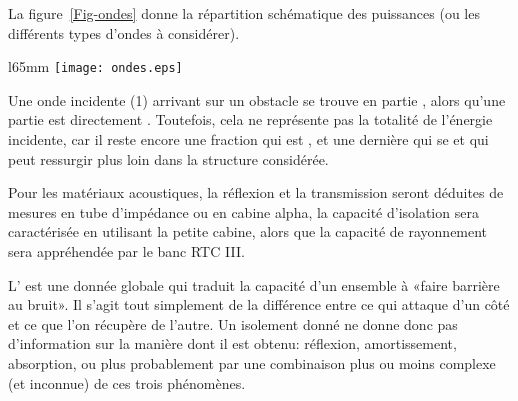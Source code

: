 La figure~\ref{Fig-ondes} donne la répartition schématique des puissances (ou les différents types d'ondes à considérer).
\begin{wrapfigure}{l}{65mm}
\centering
\texttt{[image: ondes.eps]}\hspace{1cm}
\caption{Répartition schématique des puissances}\label{Fig-ondes}%
\end{wrapfigure}
Une onde incidente (1) arrivant sur un obstacle se trouve en partie , alors qu'une partie est directement . Toutefois, cela ne représente pas la totalité de l'énergie incidente, car il reste encore une fraction qui est , et une dernière qui se  et qui peut ressurgir plus loin dans la structure considérée.

\medskip
Pour les matériaux acoustiques, la réflexion et la transmission seront déduites de mesures en tube d'impédance ou en cabine alpha, la capacité d'isolation sera caractérisée en utilisant la petite cabine, alors que la capacité de rayonnement sera appréhendée par le banc RTC III.

\medskip
L' est une donnée globale qui traduit la capacité d'un ensemble à «faire barrière au bruit». Il s'agit tout simplement de la différence entre ce qui attaque d'un côté et ce que l'on récupère de l'autre. Un isolement donné ne donne donc pas d'information sur la manière dont il est obtenu: réflexion, amortissement, absorption, ou plus probablement par une combinaison plus ou moins complexe (et inconnue) de ces trois phénomènes.

\medskip\ifVersionDuDocEstVincent\newpage\fi
